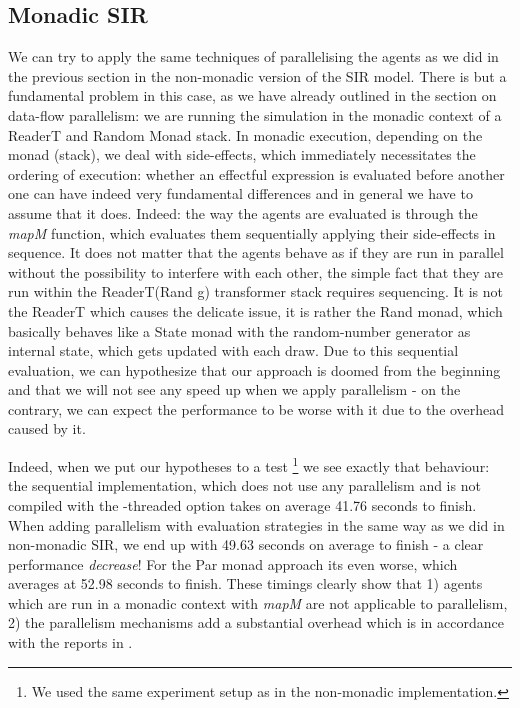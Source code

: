 \subsection{Monadic SIR}
We can try to apply the same techniques of parallelising the agents as we did in the previous section in the non-monadic version of the SIR model. There is but a fundamental problem in this case, as we have already outlined in the section on data-flow parallelism: we are running the simulation in the monadic context of a ReaderT and Random Monad stack. In monadic execution, depending on the monad (stack), we deal with side-effects, which immediately necessitates the ordering of execution: whether an effectful expression is evaluated before another one can have indeed very fundamental differences and in general we have to assume that it does.
Indeed: the way the agents are evaluated is through the \textit{mapM} function, which evaluates them sequentially applying their side-effects in sequence. It does not matter that the agents behave as if they are run in parallel without the possibility to interfere with each other, the simple fact that they are run within the ReaderT(Rand g) transformer stack requires sequencing. It is not the ReaderT which causes the delicate issue, it is rather the Rand monad, which basically behaves like a State monad with the random-number generator as internal state, which gets updated with each draw.
Due to this sequential evaluation, we can hypothesize that our approach is doomed from the beginning and that we will not see any speed up  when we apply parallelism - on the contrary, we can expect the performance to be worse with it due to the overhead caused by it.

Indeed, when we put our hypotheses to a test \footnote{We used the same experiment setup as in the non-monadic implementation.} we see exactly that behaviour: the sequential implementation, which does not use any parallelism and is not compiled with the -threaded option takes on average 41.76 seconds to finish. When adding parallelism with evaluation strategies in the same way as we did in non-monadic SIR, we end up with 49.63 seconds on average to finish - a clear performance \textit{decrease}! For the Par monad approach its even worse, which averages at 52.98 seconds to finish. These timings clearly show that 1) agents which are run in a monadic context with \textit{mapM} are not applicable to parallelism, 2) the parallelism mechanisms add a substantial overhead which is in accordance with the reports in \cite{marlow_parallel_2013}.

